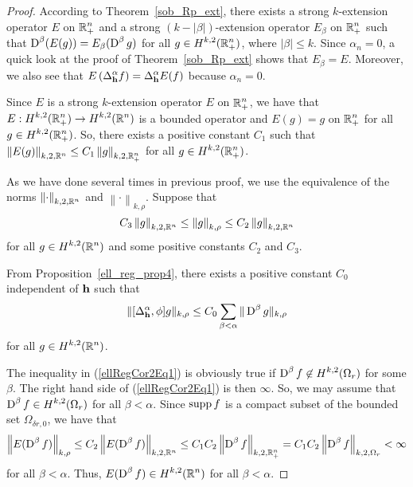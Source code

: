 \begin{proof}
According to Theorem~\ref{sob_Rp_ext}, there exists a strong
$k$-extension operator $E$ on $\displaystyle \mathbb{R}^n_+ $ and a strong
$(k-|\beta|)$-extension operator $E_\beta$ on
$\displaystyle \mathbb{R}^n_+$ such that
$\displaystyle \operatorname{D}^\beta (E(g)) = E_\beta(\operatorname{D}^\beta g)$
for all $\displaystyle g \in H^{k,2}(\mathbb{R}^n_+)$, where
$|\beta|\leq k$.  Since $\alpha_n=0$, a quick look at the proof of
Theorem~\ref{sob_Rp_ext} shows that $E_\beta = E$.
Moreover, we also see that 
$\displaystyle E\left( \Delta^\alpha_{\mathbf{h}} f\right) =
\Delta^\alpha_{\mathbf{h}} E(f)$ because $\alpha_n=0$.

Since $E$ is a strong $k$-extension operator $E$ on
$\displaystyle \mathbb{R}^n_+ $, we
have that $\displaystyle E:H^{k,2}(\mathbb{R}^n_+) \to H^{k,2}(\mathbb{R}^n)$ is a
bounded operator and $E(g) = g$ on $\displaystyle \mathbb{R}^n_+$ for all
$\displaystyle g \in H^{k,2}(\mathbb{R}^n_+)$.  So, there exists a
positive constant $C_1$ such that
$\displaystyle \left\| E(g) \right\|_{k,2,\mathbb{R}^n} \leq C_1
\left\| g \right\|_{k,2,\mathbb{R}^n_+}$ for all $\displaystyle g \in H^{k,2}(\mathbb{R}^n_+)$.

As we have done several times in previous proof,
we use the equivalence of the norms
$\displaystyle \left\|\cdot\right\|_{k,2,\mathbb{R}^n}$ and 
$\displaystyle \left\|\cdot\right\|_{k,\rho}$.  Suppose that
\[
C_3 \left\|g \right\|_{k,2,\mathbb{R}^n} \leq \left\|g \right\|_{k,\rho}
\leq C_2 \left\|g \right\|_{k,2,\mathbb{R}^n}
\]
for all $\displaystyle g \in H^{k,2}(\mathbb{R}^n)$ and some positive
constants $C_2$ and $C_3$.

From Proposition~\ref{ell_reg_prop4}, there exists a positive constant $C_0$
independent of $\mathbf{h}$ such that
\[
\| [\Delta^\alpha_{\mathbf{h}}, \phi] g \|_{k,\rho} \leq C_0
\sum_{\beta<\alpha} \| \operatorname{D}^\beta g\|_{k,\rho}
\]
for all $\displaystyle g \in H^{k,2}(\mathbb{R}^n)$.

The inequality in (\ref{ellRegCor2Eq1}) is obviously true if
$\displaystyle \operatorname{D}^\beta f \not\in H^{k,2}(\Omega_r)$ for some
$\beta$.  The right hand side of (\ref{ellRegCor2Eq1}) is then
$\infty$.  So, we may assume that
$\displaystyle \operatorname{D}^\beta f \in H^{k,2}(\Omega_r)$ for all $\beta < \alpha$.
Since $\operatorname{supp} f$ is a compact subset of the bounded set
$\Omega_{\delta r,0}$,
we have that
\[
\left\|E(\operatorname{D}^\beta f)\right\|_{k,\rho}
\leq C_2 \left\|E(\operatorname{D}^\beta f)\right\|_{k,2,\mathbb{R}^n}
\leq C_1 C_2 \left\|\operatorname{D}^\beta f\right\|_{k,2,\mathbb{R}^n_+}
= C_1 C_2 \left\|\operatorname{D}^\beta f\right\|_{k,2,\Omega_r}
< \infty
\]
for all $\beta < \alpha$.  Thus,
$\displaystyle E(\operatorname{D}^\beta f) \in H^{k,2}(\mathbb{R}^n)$
for all $\beta < \alpha$.


\end{proof}
